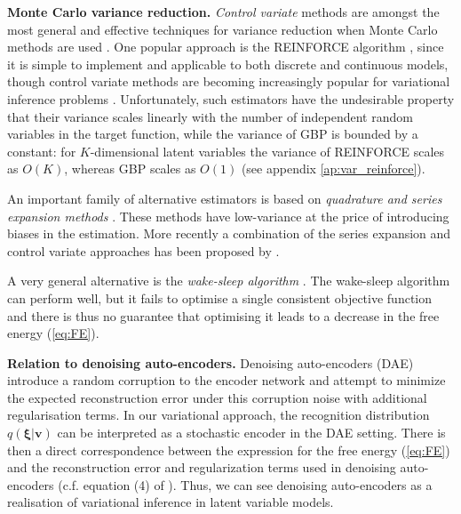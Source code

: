 \documentclass{article}
\newcommand{\vis}{\ensuremath{\mathbf{v}}} %
\newcommand{\myvecsym}[1]{\mbox{$\boldsymbol{#1}$}}
\newcommand{\vxi}{\mbox{$\myvecsym{\xi}$}}
\begin{document}
\begin{bibunit}[icml2013]
\textbf{Monte Carlo  variance reduction.} 
\textit{Control variate} methods are amongst the most 
general and 
effective techniques for variance reduction when Monte Carlo methods are used \citep{wilson1984variance}. One 
popular approach is the
REINFORCE algorithm \citep{Williams1992}, since it is simple to implement 
and applicable to both discrete and continuous  
models, though control variate methods are becoming increasingly popular 
for variational inference problems \citep{hoffman2012stochastic, 
	blei2012variational, ranganath2013, salimans2014}. Unfortunately, such 
estimators  have the undesirable property 
that their variance scales linearly with the number of independent random 
variables in the target function, while the variance of GBP is bounded by a 
constant: for $K$-dimensional latent variables the variance of 
REINFORCE scales as $O(K)$, whereas GBP scales as $O(1)$ (see appendix \ref{ap:var_reinforce}).

An important family of alternative estimators is based on \textit{quadrature and series 
	expansion methods} \citep{HonkelaV04, lappalainen2000bayesian}. These methods
have low-variance at the price of introducing biases in the estimation. More 
recently a combination of the series expansion and control variate 
approaches has been proposed by \citet{blei2012variational}.

A very general alternative 
is the \textit{wake-sleep algorithm} 
\citep{dayan1995}.  The wake-sleep algorithm can perform well, but it fails to optimise a single consistent objective function and there is 
thus no guarantee that optimising it leads to a decrease in the free energy (\ref{eq:FE}). 

\textbf{Relation to denoising auto-encoders.} 
Denoising auto-encoders (DAE) \citep{vincent2010} introduce a 
random corruption to the encoder network and attempt to minimize the 
expected  reconstruction error under this corruption noise with additional 
regularisation terms. In our variational approach, the 
recognition distribution $q(\vxi|\vis)$ can be interpreted as a stochastic 
encoder in the DAE setting. There is then a direct correspondence between the expression for the free energy 
(\ref{eq:FE}) and the reconstruction 
error and regularization terms used in denoising auto-encoders (c.f. 
equation (4) of \citet{bengio2013}). Thus, we can see denoising auto-encoders as a realisation of 
variational inference in latent variable models.


\end{bibunit}
\end{document}
